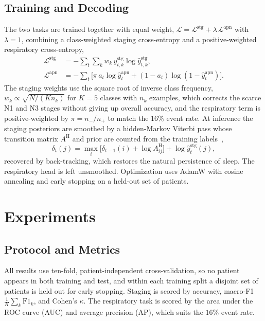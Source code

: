 \documentclass{ieeeaccess}
\begin{document}
\subsection{Training and Decoding}
The two tasks are trained together with equal weight, $\mathcal{L}=\mathcal{L}^{\mathrm{stg}}+\lambda\,\mathcal{L}^{\mathrm{apn}}$ with $\lambda=1$, combining a class-weighted staging cross-entropy and a positive-weighted respiratory cross-entropy,
\begin{align}
\mathcal{L}^{\mathrm{stg}}&=-\sum_t\sum_{k}w_k\,y^{\mathrm{stg}}_{t,k}\log\hat y^{\mathrm{stg}}_{t,k},\\
\mathcal{L}^{\mathrm{apn}}&=-\sum_t\big[\pi\,a_t\log\hat y^{\mathrm{apn}}_t+(1-a_t)\log(1-\hat y^{\mathrm{apn}}_t)\big].
\end{align}
The staging weights use the square root of inverse class frequency,
$w_k\propto\sqrt{N/(K n_k)}$ for $K=5$ classes with $n_k$ examples, which corrects the scarce
N1 and N3 stages without giving up overall accuracy, and the respiratory term is
positive-weighted by $\pi=n_-/n_+$ to match the $16\%$ event rate. At inference the staging
posteriors are smoothed by a hidden-Markov Viterbi pass whose transition matrix $A^{\mathrm H}$
and prior are counted from the training labels~\cite{chen2024hmm},
\begin{equation}
\delta_t(j)=\max_i\big[\delta_{t-1}(i)+\log A^{\mathrm H}_{ij}\big]+\log\hat y^{\mathrm{stg}}_t(j),
\end{equation}
recovered by back-tracking, which restores the natural persistence of sleep. The respiratory
head is left unsmoothed. Optimization uses AdamW with cosine annealing and early stopping on a
held-out set of patients.

\section{Experiments}
\label{sec:results}
\subsection{Protocol and Metrics}
All results use ten-fold, patient-independent cross-validation, so no patient appears in both
training and test, and within each training split a disjoint set of patients is held out for
early stopping. Staging is scored by accuracy, macro-F1 $\tfrac{1}{K}\sum_k\mathrm{F1}_k$, and
Cohen's $\kappa$. The respiratory task is scored by the area under the ROC curve (AUC) and
average precision (AP), which suits the $16\%$ event rate.
\end{document}
